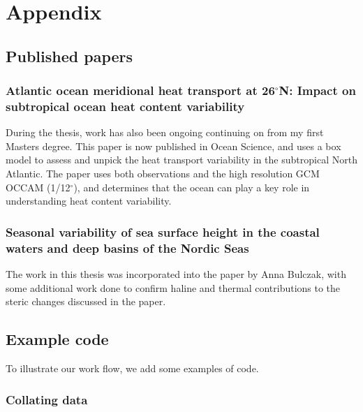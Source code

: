 \documentclass[a4paper,12pt, openright, titlepage]{book}
\begin{document}
% 
% 
% 
% 
% 
\pagebreak
%
%

\appendix
 \noappendicestocpagenum
 
{}
\chapter*{Appendix}\label{appendix}


\pagebreak
\section{Published papers}
\subsection{Atlantic ocean meridional heat transport at 26$^{\circ}$N: Impact on subtropical ocean heat content variability}\label{paperOHC}
During the thesis, work has also been ongoing continuing on from my first Masters degree. This paper is now published in Ocean Science, and uses a box model to assess and unpick the heat transport variability in the subtropical North Atlantic. The paper uses both observations and the high resolution GCM OCCAM (1/12$^{\circ}$), and determines that the ocean can play a key role in understanding heat content variability. 

\subsection{Seasonal variability of sea surface height in the coastal waters and deep basins of the Nordic Seas}\label{paperSH}
The work in this thesis was incorporated into the paper by Anna Bulczak, with some additional work done to confirm haline and thermal contributions to the steric changes discussed in the paper.

\section{Example code}
To illustrate our work flow, we add some examples of code.
\subsection*{Collating data}\label{collating}


\backmatter

\clearpage
\end{document}
